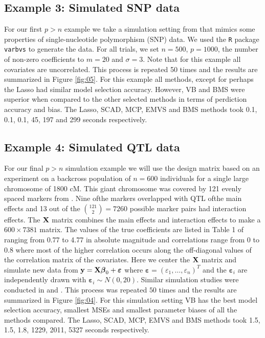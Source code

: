 \documentclass[11pt]{article}
\newtheorem{Main Result}{Main Result}
\def\vectorfontone{\bf}
\def\vectorfonttwo{\boldsymbol}
\def\vy{{\vectorfontone y}}                      %
\def\vbeta{{\vectorfonttwo \beta}}               %
\def\vvarepsilon{{\vectorfonttwo \varepsilon}}   %
\def\matrixfontone{\bf}
\def\mX{{\matrixfontone X}}                      %
\newcommand{\joc}[1]{{\color{black}#1}}
\begin{document}
 \joc{ 
\subsection{Example 3: Simulated SNP data}

For our first $p>n$ example we take a simulation setting from \cite{Carbonetto2011} 
that mimics some properties of single-nucleotide polymorphism (SNP) data. We used 
the {\tt R} package  {\tt varbvs} \citep{varbvs} to generate the data. For all trials, 
we set $n = 500$, $p = 1000$, the number of non-zero coefficients to $m = 20$ and 
$\sigma = 3$. Note that for this example all covariates are uncorrelated.
This process is repeated 50 times and the results are summarized in Figure \ref{fig:05}.
For this example all methods, except for perhaps the Lasso had similar 
model selection accuracy. However, VB and BMS were superior when compared to the
other selected methods in terms of perdiction accuracy and bias. 
The Lasso, SCAD, MCP, EMVS and BMS methods took 0.1, 0.1, 0.1, 45, 197 and 299 
seconds respectively.
 


\subsection{Example 4: Simulated QTL data}

 
For our final $p>n$ simulation example we will use the design matrix based on an
experiment on a backcross population of $n=600$ individuals for a single large 
chromosome of 1800 cM. This giant chromosome was covered by 121 evenly 
spaced markers from \cite{Xu2007}. Nine ofthe markers overlapped with QTL ofthe main effects 
and 13 out of the ${121 \choose 2} = 7260$ possible marker pairs had interaction 
effects. The $\mX$ matrix combines the main effects and interaction effects to
make a $600\times 7381$ matrix. The values of the true coefficients are listed in 
Table 1 of \cite{Xu2007} ranging from 0.77 to 4.77 in absolute magnitude and
correlations range from 0 to 0.8 where most of the higher correlation occurs
along the off-diagonal values of the correlation matrix of the covariates. Here
we center the $\mX$ matrix and simulate new data from $\vy = \mX\vbeta_0 + \vvarepsilon$
where $\vvarepsilon = (\varepsilon_1,\ldots,\varepsilon_n)^T$ and the $\vvarepsilon_i$
are independently drawn with $\vvarepsilon_i \sim N(0,20)$. Similar simulation
studies were conducted in \cite{Xu2007} and \cite{LiSillanpaa2012}. This
process was repeated $50$ times and the results are summarized in Figure \ref{fig:04}.
For this simulation setting VB has the best model selection accuracy,
smallest MSEs and smallest parameter biases of all the methods compared.
The Lasso, SCAD, MCP, EMVS and BMS methods took 1.5, 1.5, 1.8, 1229, 2011, 5327
seconds respectively.






  }
\end{document}
